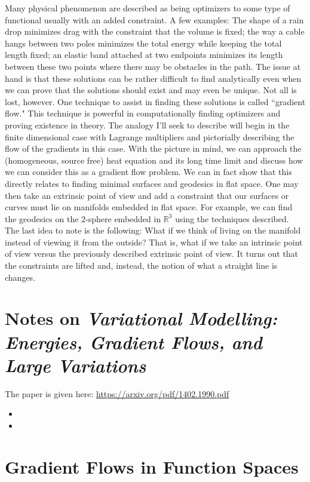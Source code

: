 \documentclass[12pt]{report} %
\newcommand{\R}{\mathbb{R}}
\theoremstyle{definition}
\begin{document}
Many physical phenomenon are described as being optimizers to some type of functional usually with an added constraint.  A few examples: The shape of a rain drop minimizes drag with the constraint that the volume is fixed; the way a cable hangs between two poles minimizes the total energy while keeping the total length fixed; an elastic band attached at two endpoints minimizes its length between these two points where there may be obstacles in the path.  The issue at hand is that these solutions can be rather difficult to find analytically even when we can prove that the solutions should exist and may even be unique.  Not all is lost, however.  One technique to assist in finding these solutions is called ``gradient flow." This technique is powerful in computationally finding optimizers and proving existence in theory.
The analogy I'll seek to describe will begin in the finite dimensional case with Lagrange multipliers and pictorially describing the flow of the gradients in this case.  With the picture in mind, we can approach the (homogeneous, source free) heat equation and its long time limit and discuss how we can consider this as a gradient flow problem.  We can in fact show that this directly relates to finding minimal surfaces and geodesics in flat space.  One may then take an extrinsic point of view and add a constraint that our surfaces or curves must lie on manifolds embedded in flat space.  For example, we can find the geodesics on the 2-sphere embedded in $\R^3$ using the techniques described.  The last idea to note is the following: What if we think of living on the manifold instead of viewing it from the outside? That is, what if we take an intrinsic point of view versus the previously described extrinsic point of view.  It turns out that the constraints are lifted and, instead, the notion of what a straight line is changes.  

\section{Notes on \emph{Variational Modelling: Energies, Gradient Flows, and Large Variations}}

The paper is given here: \url{https://arxiv.org/pdf/1402.1990.pdf}

\begin{itemize}
    \item 
    \item 
\end{itemize}

\section{Gradient Flows in Function Spaces}
\end{document}

